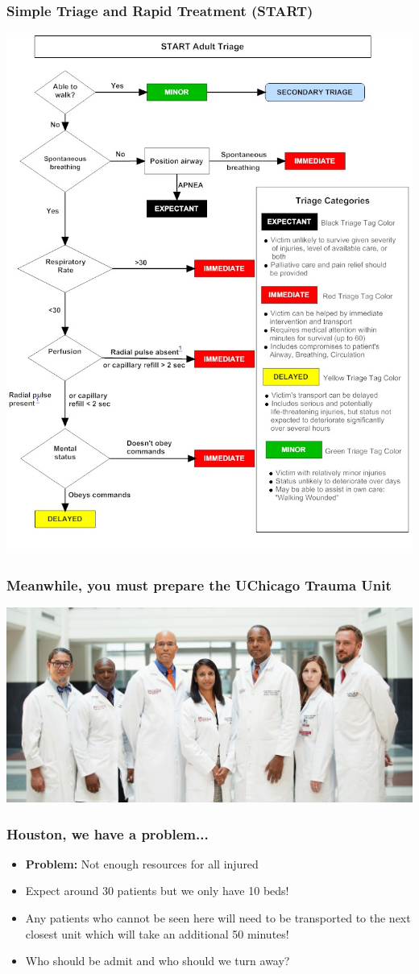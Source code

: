 \documentclass{beamer}
\begin{document}
\begin{frame}
  \frametitle{Simple Triage and Rapid Treatment (START)}
  \centering
  \includegraphics[width=.5\textwidth]{StartAdultTriageAlgorithm}
\end{frame}

\begin{frame}
  \frametitle{Meanwhile, you must prepare the UChicago Trauma Unit}
  \includegraphics[width=1\textwidth]{uchicago_trama}
\end{frame}

\begin{frame}
  \frametitle{Houston, we have a problem...}
  \begin{itemize}
    \item \textbf{Problem:} Not enough resources for all injured
    \item Expect around 30 patients but we only have 10 beds!\pause
    \item Any patients who cannot be seen here will need to be transported to the next closest unit which will take an additional 50 minutes!\pause
    \item Who should be admit and who should we turn away?
  \end{itemize}
\end{frame}
\end{document}
